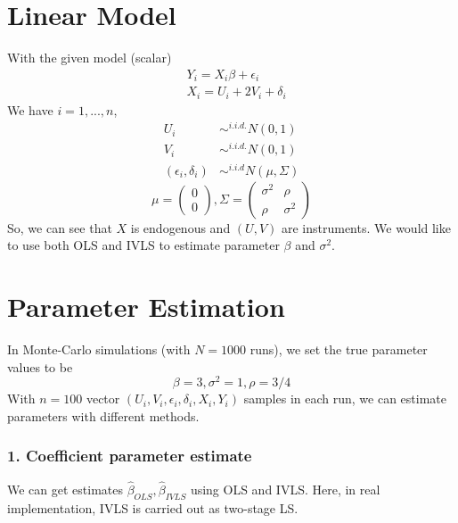 \documentclass{article}\usepackage{graphicx, color}
\begin{document}
\section*{Linear Model}

\hspace{12 pt} With the given model (scalar)
\begin{equation}
\begin{split}
&Y_i = X_i\beta + \epsilon_i \\
&X_i = U_i + 2V_i + \delta_i
\end{split}
\end{equation}
We have $i=1,...,n$,
\begin{equation}
\begin{split}
U_i &\sim^{i.i.d.} N(0, 1)\\
V_i &\sim^{i.i.d.} N(0,1) \\
(\epsilon_i, \delta_i) &\sim^{i.i.d} N(\mu, \Sigma)
\end{split}
\end{equation}
\begin{displaymath}
\mu =
  \begin{pmatrix}
  0 \\
  0
  \end{pmatrix}
, \Sigma = 
  \begin{pmatrix}
  \sigma^2 & \rho \\
  \rho         & \sigma^2
  \end{pmatrix}
\end{displaymath}
So, we can see that $X$ is endogenous and $(U,V)$ are instruments. We
would like to use both OLS and IVLS to estimate parameter $\beta$ and
$\sigma^2$.



\section*{Parameter Estimation}
\hspace{12 pt} In Monte-Carlo simulations (with $N=1000$ runs),
we set the true parameter values to be 
\begin{displaymath}
\beta = 3, \sigma^2 = 1, \rho= 3/4
\end{displaymath}
With $n = 100$ vector $(U_i, V_i, \epsilon_i, \delta_i, X_i,
Y_i)$ samples in each run, we can estimate parameters with different
methods.




\subsubsection*{1. Coefficient parameter estimate}
\hspace{12 pt}  We can get estimates $\hat{\beta}_{OLS},
\hat{\beta}_{IVLS}$ using OLS and IVLS. Here, in real implementation,
IVLS is carried out as two-stage LS. 
\end{document}
